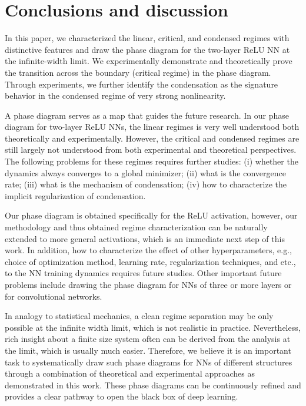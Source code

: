 \documentclass{article}
\begin{document}
\section{Conclusions and discussion}

In this paper, we characterized the linear, critical, and condensed regimes with distinctive features and draw the phase diagram for the two-layer ReLU NN at the infinite-width limit. We experimentally demonstrate and theoretically prove the transition across the boundary (critical regime) in the phase diagram. Through experiments, we further identify the condensation as the signature behavior in the condensed regime of very strong nonlinearity.

A phase diagram serves as a map that guides the future research. In our phase diagram for two-layer ReLU NNs, the linear regimes is very well understood both theoretically and experimentally. However, the critical and condensed regimes are still largely not understood from both experimental and theoretical perspectives. The following problems for these regimes requires further studies: (i) whether the dynamics always converges to a global minimizer; (ii) what is the convergence rate; (iii) what is the mechanism of condensation; (iv) how to characterize the implicit regularization of condensation.

Our phase diagram is obtained specifically for the ReLU activation, however, our methodology and thus obtained regime characterization can be naturally extended to more general activations, which is an immediate next step of this work. In addition, how to characterize the effect of other hyperparameters, e.g., choice of optimization method, learning rate, regularization techniques, and etc., to the NN training dynamics requires future studies. Other important future problems include drawing the phase diagram for NNs of three or more layers or for convolutional networks.

In analogy to statistical mechanics, a clean regime separation may be only possible at the infinite width limit, which is not realistic in practice. Nevertheless, rich insight about a finite size system often can be derived from the analysis at the limit, which is usually much easier. Therefore, we believe it is an important task to systematically draw such phase diagrams for NNs of different structures through a combination of theoretical and experimental approaches as demonstrated in this work. These phase diagrams can be continuously refined and provides a clear pathway to open the black box of deep learning.
\end{document}
